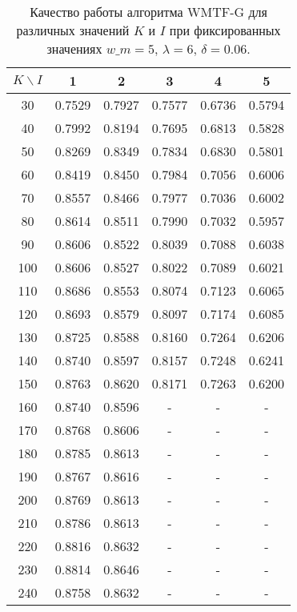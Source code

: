     \begin{table}[ht!]
        \caption{Качество работы алгоритма WMTF-G для различных значений $K$ и $I$ при фиксированных значениях $w\_m=5$, $\lambda=6$, $\delta=0.06$. \bigskip}
        \centering
        \label{tabular:wtmfg_test5}
        \begin{tabular}{|c|c|c|c|c|c|} \hline
            $K \backslash I$ & 1 & 2 & 3 & 4 & 5  \\ \hline
            30 & 0.7529 & 0.7927 & 0.7577 & 0.6736 & 0.5794  \\ \hline
            40 & 0.7992 & 0.8194 & 0.7695 & 0.6813 & 0.5828  \\ \hline
            50 & 0.8269 & 0.8349 & 0.7834 & 0.6830 & 0.5801  \\ \hline
            60 & 0.8419 & 0.8450 & 0.7984 & 0.7056 & 0.6006  \\ \hline
            70 & 0.8557 & 0.8466 & 0.7977 & 0.7036 & 0.6002  \\ \hline
            80 & 0.8614 & 0.8511 & 0.7990 & 0.7032 & 0.5957  \\ \hline
            90 & 0.8606 & 0.8522 & 0.8039 & 0.7088 & 0.6038  \\ \hline
            100 & 0.8606 & 0.8527 & 0.8022 & 0.7089 & 0.6021  \\ \hline
            110 & 0.8686 & 0.8553 & 0.8074 & 0.7123 & 0.6065  \\ \hline
            120 & 0.8693 & 0.8579 & 0.8097 & 0.7174 & 0.6085  \\ \hline
            130 & 0.8725 & 0.8588 & 0.8160 & 0.7264 & 0.6206  \\ \hline
            140 & 0.8740 & 0.8597 & 0.8157 & 0.7248 & 0.6241  \\ \hline
            150 & 0.8763 & 0.8620 & 0.8171 & 0.7263 & 0.6200  \\ \hline
            160 & 0.8740 & 0.8596 & - & - & - \\ \hline
            170 & 0.8768 & 0.8606 & - & - & -  \\ \hline
            180 & 0.8785 & 0.8613 & - & - & -  \\ \hline
            190 & 0.8767 & 0.8616 & - & - & -  \\ \hline
            200 & 0.8769 & 0.8613 & - & - & -  \\ \hline
            210 & 0.8786 & 0.8613 & - & - & -  \\ \hline
            220 & 0.8816 & 0.8632 & - & - & -  \\ \hline
            230 & 0.8814 & 0.8646 & - & - & -  \\ \hline
            240 & 0.8758 & 0.8632 & - & - & -  \\ \hline
        \end{tabular}
    \end{table}

